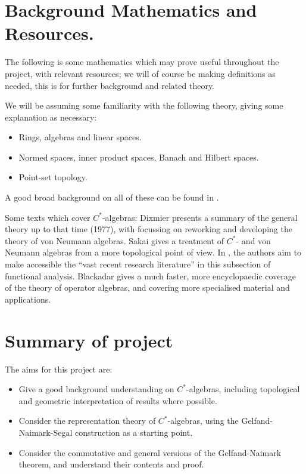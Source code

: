 \documentclass[12pt,a4paper]{report}
\theoremstyle{plain}
\theoremstyle{definition}
\newcommand{\1}{\mathbbm{1}}
\begin{document}
\section{Background Mathematics and Resources.}	
	The following is some mathematics which may prove useful throughout the project, with relevant resources; 
	we will of course be making definitions as needed, this is for further background and related theory.

	We will be assuming some familiarity with the following theory, giving some explanation as necessary:
\begin{itemize}
	\item Rings, algebras and linear spaces.
	\item Normed spaces, inner product spaces, Banach and Hilbert spaces.
	\item Point-set topology.
\end{itemize}
	A good broad background on all of these can be found in \cite{simmons83}.

	Some texts which cover $C^\ast$-algebras: 
	Dixmier \cite{dixmier77} presents a summary of the general theory up to that time (1977), with 
	\cite{dixmier81} focussing on reworking and developing the theory of von Neumann algebras. 
	Sakai \cite{sakai71} gives a treatment of $C^\ast$- and von Neumann algebras from a more topological point 
	of view. In \cite{kadison83,kadison86}, the authors aim to make accessible the ``vast recent research 
	literature'' in this subsection of functional analysis.
	Blackadar \cite{blackadar06} gives a much faster, more encyclopaedic coverage of the theory of operator 
	algebras, and covering more specialised material and applications.
	
	
\section{Summary of project}
	The aims for this project are:
\begin{itemize}
	\item Give a good background understanding on $C^\ast$-algebras, including topological and geometric interpretation of results where possible.
	\item Consider the representation theory of $C^\ast$-algebras, using the Gelfand-Naimark-Segal construction as a starting point.
	\item Consider the commutative and general versions of the Gelfand-Naimark theorem, and understand their contents and proof.
\end{itemize}
\end{document}
